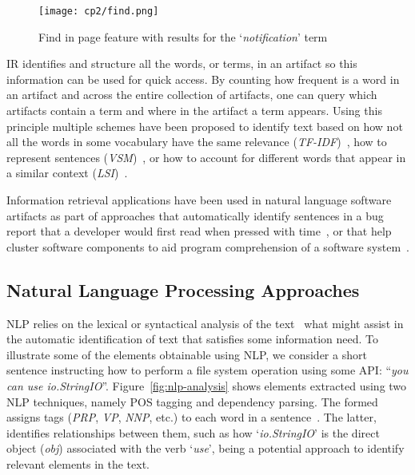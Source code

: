 
\medskip
\begin{figure}[h!]
    \centering
    \texttt{[image: cp2/find.png]}
    \caption{Find in page feature with results for the `\textit{notification}' term}
    \label{fig:find-in-page}
\end{figure}





\acs{IR} identifies and structure all the words, or terms, 
in an artifact so this information can be used for quick access. 
By counting how frequent is a word in 
an artifact and across the entire collection of artifacts, 
one can query which artifacts contain a term and where in the artifact a term appears. 
Using this principle multiple schemes have been proposed 
to identify text based on 
how not all the words in some vocabulary have the same relevance (\textit{TF-IDF})~\cite{luhn1957tf, jones2004idf}, 
how to  represent sentences (\textit{VSM})~\cite{salton1975vector}, 
or how to account for different words that appear in a similar context (\textit{LSI})~\cite{dumais1994latent}.





Information retrieval applications have been used in natural language software artifacts 
as part of approaches that
automatically identify sentences in a bug report that a developer would first read when pressed with time~\cite{Lotufo2012},
or that help cluster software components to aid program comprehension of a software system~\cite{Marcus2003}.



\subsection{Natural Language Processing Approaches}

\acf{NLP} relies on the lexical or syntactical analysis of the text~\cite{jurafsky2014speech}
what might assist in the automatic identification of text that satisfies some information need. 
To illustrate some of the elements obtainable using \acs{NLP}, we consider a short sentence 
instructing how to perform a file system operation using some API: ``\textit{you can use io.StringIO}''.
Figure~\ref{fig:nlp-analysis} shows elements extracted using two \acs{NLP} techniques,
namely \acf{POS} tagging and dependency parsing.
The formed assigns tags  ({\small \textit{PRP}, \textit{VP}, \textit{NNP},} etc.) to each word 
in a sentence~\cite{taylor2003penn}. The latter, identifies
relationships between them, such as how 
`\textit{io.StringIO}' is the direct object (\textit{obj})
associated with the verb `\textit{use}', 
being a potential approach to identify relevant elements in the text.



